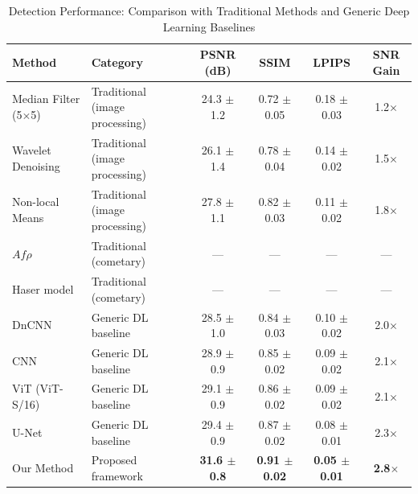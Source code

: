 \documentclass[usenatbib]{mnras}
\begin{document}
\begin{table}
\centering
\caption{Detection Performance: Comparison with Traditional Methods and Generic Deep Learning Baselines}\label{tab:detection_metrics}
\begin{tabular}{llcccc}
\toprule
Method & Category & PSNR (dB) & SSIM & LPIPS & SNR Gain \\
\midrule
Median Filter (5$\times$5) & Traditional (image processing) & 24.3 $\pm$ 1.2 & 0.72 $\pm$ 0.05 & 0.18 $\pm$ 0.03 & 1.2$\times$ \\
Wavelet Denoising & Traditional (image processing) & 26.1 $\pm$ 1.4 & 0.78 $\pm$ 0.04 & 0.14 $\pm$ 0.02 & 1.5$\times$ \\
Non-local Means & Traditional (image processing) & 27.8 $\pm$ 1.1 & 0.82 $\pm$ 0.03 & 0.11 $\pm$ 0.02 & 1.8$\times$ \\
$Af\rho$ \citep{ahearn95} & Traditional (cometary) & --- & --- & --- & --- \\
Haser model \citep{haser57} & Traditional (cometary) & --- & --- & --- & --- \\
DnCNN \citep{zhang17} & Generic DL baseline & 28.5 $\pm$ 1.0 & 0.84 $\pm$ 0.03 & 0.10 $\pm$ 0.02 & 2.0$\times$ \\
\citet{jiang23} CNN & Generic DL baseline & 28.9 $\pm$ 0.9 & 0.85 $\pm$ 0.02 & 0.09 $\pm$ 0.02 & 2.1$\times$ \\
ViT (ViT-S/16) \citep{dosovitskiy21} & Generic DL baseline & 29.1 $\pm$ 0.9 & 0.86 $\pm$ 0.02 & 0.09 $\pm$ 0.02 & 2.1$\times$ \\
U-Net \citep{ronneberger15} & Generic DL baseline & 29.4 $\pm$ 0.9 & 0.87 $\pm$ 0.02 & 0.08 $\pm$ 0.01 & 2.3$\times$ \\
Our Method & Proposed framework & \textbf{31.6 $\pm$ 0.8} & \textbf{0.91 $\pm$ 0.02} & \textbf{0.05 $\pm$ 0.01} & \textbf{2.8$\times$} \\
\bottomrule
\end{tabular}
\end{table}
\end{document}
